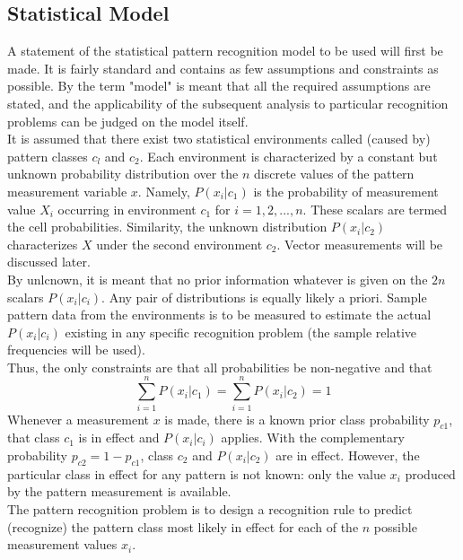 \documentclass[10pt, a4paper]{article}
\begin{document}
\begin{CJK*}{UTF8}{bsmi}
\begin{multicols}{2}
\section{Statistical Model}
\hspace{1em} A statement of the statistical pattern recognition model to be used will first be made. It is fairly standard and contains as few assumptions and constraints as possible. 
By the term "model" is meant that all the required assumptions are stated, and the applicability of the subsequent analysis to particular recognition problems can be judged on the model itself. \\
\hspace{1em} It is assumed that there exist two statistical environments called (caused by) pattern classes $c_l$ and $c_2$. 
Each environment is characterized by a constant but unknown probability distribution over the $n$ discrete values of the pattern measurement variable $x$. 
Namely, $P(x_i | c_1)$ is the probability of measurement value $X_i$ occurring in environment $c_1$ for $i = 1, 2, . . . , n$. These scalars are termed the cell probabilities. Similarity, the unknown distribution $P(x_i | c_2)$ characterizes $X$ under the second environment $c_2$. Vector measurements will be discussed later. \\
\hspace{1em} By unlcnown, it is meant that no prior information whatever is given on the $2n$ scalars $P(x_i | c_i)$. Any pair of distributions is equally likely a priori. Sample pattern data from the environments is to be measured to estimate the actual $P(x_i | c_i)$ existing in any specific recognition problem (the sample relative frequencies will be used). \\
\hspace{1em} Thus, the only constraints are that all probabilities be non-negative and that 
\begin{equation}
    \sum_{i=1}^{n}P(x_i | c_1) = \sum_{i=1}^{n}P(x_i | c_2) = 1
\end{equation}
\hspace{1em} Whenever a measurement $x$ is made, there is a known prior class probability $p_{c1}$, that class $c_1$ is in effect and $P(x_i | c_i)$ applies. 
With the complementary probability $p_{c2} = 1 - p_{c1}$, class $c_2$ and $P(x_i | c_2)$ are in effect. 
However, the particular class in effect for any pattern is not known: only the value $x_i$ produced by the pattern measurement is available. \\
\hspace{1em} The pattern recognition problem is to design a recognition rule to predict (recognize) the pattern class most likely in effect for each of the $n$ possible measurement values $x_i$. 

\end{multicols}
\end{CJK*}
\end{document}
